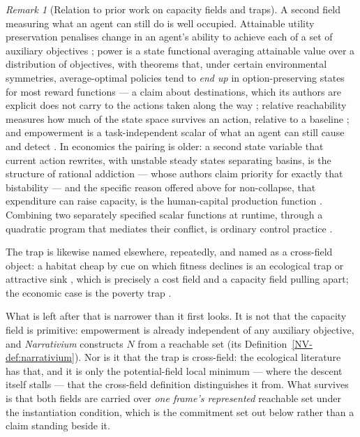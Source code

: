 \documentclass[11pt,a4paper]{article}
\theoremstyle{remark}
\newtheorem{remark}[definition]{Remark}
\begin{document}
\begin{remark}[Relation to prior work on capacity fields and traps]\label{rem:second-field-prior}
A second field measuring what an agent can still do is well occupied. Attainable utility preservation
penalises change in an agent's ability to achieve each of a set of auxiliary objectives
\citep{turner2020}; power is a state functional averaging attainable value over a distribution of
objectives, with theorems that, under certain environmental symmetries, average-optimal policies tend
to \emph{end up} in option-preserving states for most reward functions --- a claim about
destinations, which its authors are explicit does not carry to the actions taken along the way
\citep{turner2021}; relative reachability measures how much of the state space survives an action,
relative to a baseline \citep{krakovna2018}; and empowerment is a task-independent scalar of what an
agent can still cause and detect \citep{klyubin2005}. In economics the pairing is older: a second
state variable that current action rewrites, with unstable steady states separating basins, is the
structure of rational addiction --- whose authors claim priority for exactly that bistability
\citep{beckermurphy1988} --- and the specific reason offered above for non-collapse, that expenditure
can raise capacity, is the human-capital production function \citep{benporath1967}. Combining two
separately specified scalar functions at runtime, through a quadratic program that mediates their
conflict, is ordinary control practice \citep{ames2017}.

The trap is likewise named elsewhere, repeatedly, and named as a cross-field object: a habitat cheap
by cue on which fitness declines is an ecological trap or attractive sink
\citep{robertson2006,delibes2001}, which is precisely a cost field and a capacity field pulling
apart; the economic case is the poverty trap \citep{azariadis2005}.

What is left after that is narrower than it first looks. It is not that the capacity field is
primitive: empowerment is already independent of any auxiliary objective, and \emph{Narrativium}
constructs $N$ from a reachable set (its Definition~\ref{NV-def:narrativium}). Nor is it that the trap is cross-field: the ecological
literature has that, and it is only the potential-field local minimum --- where the descent itself
stalls --- that the cross-field definition distinguishes it from. What survives is that both fields
are carried over \emph{one frame's represented} reachable set under the instantiation condition,
which is the commitment set out below rather than a claim standing beside it.
\end{remark}
\end{document}
